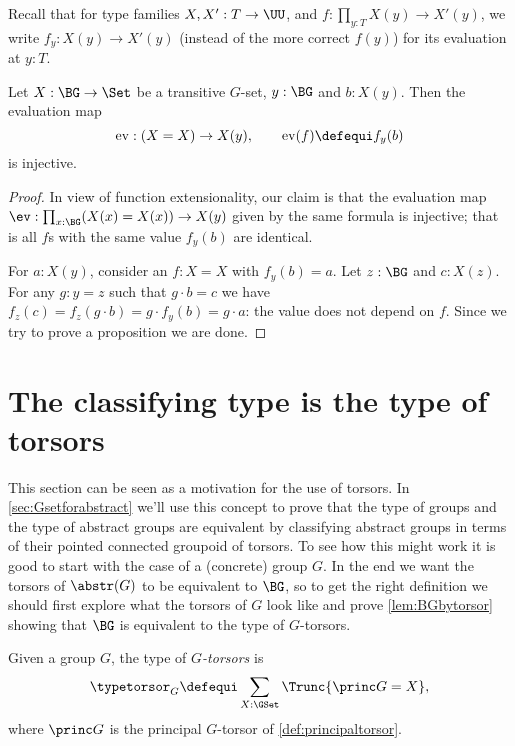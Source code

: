 Recall that for type families $X,X':T\to\UU$, and
$f:\prod_{y:T}X(y)\to X'(y)$, we write $f_y:X(y)\to X'(y)$ (instead of
the more correct $f(y)$) for its evaluation at $y:T$.
\begin{lemma}
  \label{lem:evisinjwhentransitive}
  Let $X:\BG\to\Set$ be a transitive $G$-set, $y:\BG$ and $b:X(y)$.  Then the evaluation map
$$\mathrm{ev}:(X=X)\to X(y),\qquad \mathrm{ev}(f)\defequi f_y(b)$$
is injective.
\end{lemma}
\begin{proof}
  In view of function extensionality, our claim is that the evaluation
  map $\ev:\prod_{x:\BG}(X(x)=X(x))\to X(y)$ given by the same formula
  is injective; that is all $f$s with the same value $f_y(b)$ are
  identical.

  For $a:X(y)$, consider an $f:X=X$ with $f_y(b)=a$.  Let $z:\BG$ and
  $c:X(z)$.  For any $g:y=z$ such that $g\cdot b=c$ we have
  $f_z(c)=f_z(g\cdot b)=g \cdot f_y(b)=g \cdot a$: the value does not
  depend on $f$. Since we try to prove a proposition we are done.
\end{proof}



\section{The classifying type is the type of torsors}
This section can be seen as a motivation for the use of torsors.
In \cref{sec:Gsetforabstract} we'll use this concept to prove that the type of groups and the type of abstract groups are equivalent by classifying abstract groups in terms of their pointed connected groupoid of torsors.  To see how this might work it is good to start with the case of a (concrete) group $G$.  In the end we want the torsors of $\abstr(G)$ to be equivalent to $\BG$, so to get the right definition we should first explore what the torsors of $G$ look like and prove \cref{lem:BGbytorsor} showing that $\BG$ is equivalent to the type of $G$-torsors.
\label{sec:torsors}
\begin{definition}
  Given a group  $G$, the type of {\em$G$-torsors} is
$$\typetorsor_G\defequi\sum_{X:\GSet}\Trunc{\princ G=X},$$
where $\princ G$ is the principal $G$-torsor of \cref{def:principaltorsor}.
\end{definition}


